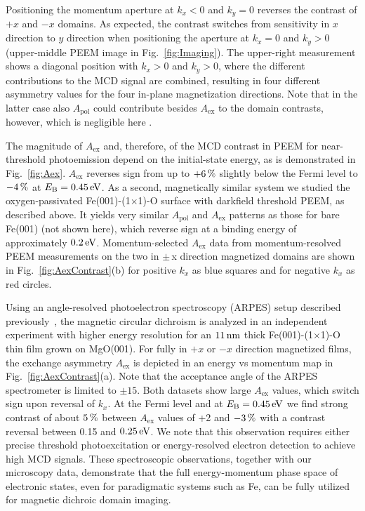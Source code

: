 \documentclass[prl,twocolumn,floatfix,superscriptaddress,aps]{revtex4-2}
\begin{document}
Positioning the momentum aperture at $k_x < 0$ and $k_y = 0$ reverses the contrast of $+x$ and $-x$ domains. As expected, the contrast switches from sensitivity in $x$ direction to $y$ direction when positioning the aperture at $k_x = 0$ and $k_y > 0$ (upper-middle PEEM image in Fig.~\ref{fig:Imaging}). The upper-right measurement shows a diagonal position with $k_x > 0$ and $k_y > 0$, where the different contributions to the MCD signal are combined, resulting in four different asymmetry values for the four in-plane magnetization directions. Note that in the latter case also $A_{\mathrm{pol}}$ could contribute besides $A_{\mathrm{ex}}$ to the domain contrasts, however, which is negligible here \cite{schumann2024}. 

The magnitude of $A_{\mathrm{ex}}$ and, therefore, of the MCD contrast in PEEM for near-threshold photoemission depend on the initial-state energy, as is demonstrated in Fig.~\ref{fig:Aex}. $A_{\mathrm{ex}}$ reverses sign from up to $\unit[+6]{\%}$ slightly below the Fermi level to $\unit[-4]{\%}$ at $E_{\mathrm{B}} = \unit[0.45]{eV}$. 
As a second, magnetically similar system we studied the oxygen-passivated Fe(001)-(1$\times$1)-O surface with darkfield threshold PEEM, as described above. It yields very similar $A_{\mathrm{pol}}$ and $A_{\mathrm{ex}}$ patterns as those for bare Fe(001) (not shown here), which reverse sign at a binding energy of approximately $\unit[0.2]{eV}$. Momentum-selected $A_{\mathrm{ex}}$ data from momentum-resolved PEEM measurements on 
the two in $\pm$\,x direction magnetized domains are shown in Fig.~\ref{fig:AexContrast}(b) for positive $k_x$ as blue squares and for negative $k_x$ as red circles. 

Using an angle-resolved photoelectron spectroscopy (ARPES) setup described previously~\cite{gillmeister2018, gillmeister2020}, the magnetic circular dichroism is analyzed in an independent experiment with higher energy resolution for an $\unit[11]{nm}$ thick Fe(001)-(1$\times$1)-O thin film grown on MgO(001). For fully in $+x$ or $-x$ direction magnetized films, the exchange asymmetry $A_{\mathrm{ex}}$ is depicted in an energy vs momentum map in Fig.~\ref{fig:AexContrast}(a). Note that the acceptance angle of the ARPES spectrometer is limited to $\pm15$\textdegree. Both datasets show large $A_{\mathrm{ex}}$ values, which switch sign upon reversal of $k_x$. At the Fermi level and at $E_{\mathrm{B}} = \unit[0.45]{eV}$ we find strong contrast of about $\unit[5]{\%}$ between $A_{\mathrm{ex}}$ values of +2 and $\unit[-3]{\%}$ with a contrast reversal between 0.15 and $\unit[0.25]{eV}$. We note that this observation requires either precise threshold photoexcitation or energy-resolved electron detection to achieve high MCD signals.
These spectroscopic observations, together with our microscopy data, demonstrate that the full energy-momentum phase space of electronic states, even for paradigmatic systems such as Fe, can be fully utilized for magnetic dichroic domain imaging.
\end{document}
